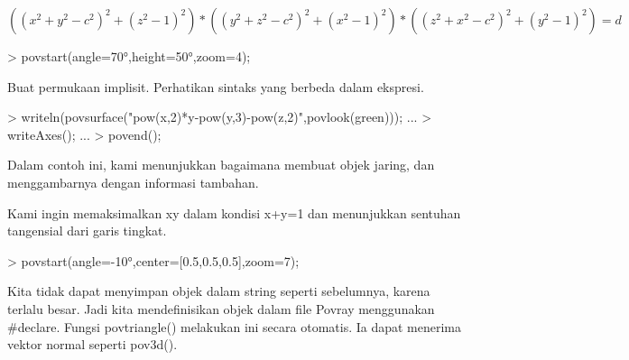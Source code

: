 \documentclass{report}
\begin{document}
\begin{eulernotebook}
\begin{eulercomment}
\begin{eulercomment}
\begin{eulercomment}
\end{eulercomment}
\begin{eulerformula}
\[
((x^2+y^2-c^2)^2+(z^2-1)^2)*((y^2+z^2-c^2)^2+(x^2-1)^2)*((z^2+x^2-c^2)^2+(y^2-1)^2)=d
\]
\end{eulerformula}
\begin{eulerprompt}
> povstart(angle=70°,height=50°,zoom=4);
\end{eulerprompt}
\begin{eulercomment}
Buat permukaan implisit. Perhatikan sintaks yang berbeda dalam
ekspresi.
\end{eulercomment}
\begin{eulerprompt}
> writeln(povsurface("pow(x,2)*y-pow(y,3)-pow(z,2)",povlook(green))); ...
> writeAxes(); ...
> povend();
\end{eulerprompt}
\begin{eulercomment}
Dalam contoh ini, kami menunjukkan bagaimana membuat objek jaring, dan
menggambarnya dengan informasi tambahan.

Kami ingin memaksimalkan xy dalam kondisi x+y=1 dan menunjukkan
sentuhan tangensial dari garis tingkat.
\end{eulercomment}
\begin{eulerprompt}
> povstart(angle=-10°,center=[0.5,0.5,0.5],zoom=7);
\end{eulerprompt}
\begin{eulercomment}
Kita tidak dapat menyimpan objek dalam string seperti sebelumnya,
karena terlalu besar. Jadi kita mendefinisikan objek dalam file Povray
menggunakan #declare. Fungsi povtriangle() melakukan ini secara
otomatis. Ia dapat menerima vektor normal seperti pov3d().


\end{eulercomment}
\end{eulercomment}
\end{eulercomment}
\end{eulernotebook}
\end{document}
